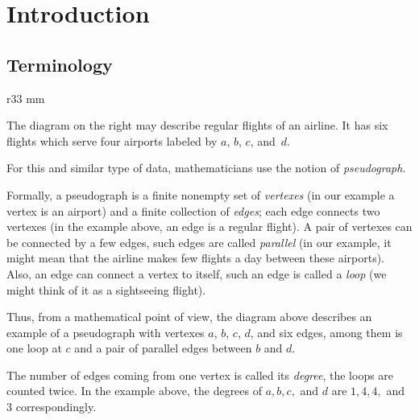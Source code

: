 \chapter{Introduction}
\section*{Terminology}

\begin{wrapfigure}{r}{33 mm}
\end{wrapfigure}

The diagram on the right may describe regular flights of an airline.
It has six flights which serve four airports labeled by $a$, $b$, $c$, and~$d$.

For this and similar type of data, mathematicians use the notion of \emph{pseudograph}.

Formally, a pseudograph is a finite nonempty set of \emph{vertexes}  (in our example a vertex is an airport) 
and a finite collection of \emph{edges}; each edge connects two vertexes (in the example above, an edge is a regular flight).
A pair of vertexes can be connected by a few edges, such edges are called \emph{parallel} (in our example, it might mean that the airline makes few flights a day between these airports). 
Also, an edge can connect a vertex to itself, such an edge is called a \emph{loop} (we might think of it as a sightseeing flight).

Thus, from a mathematical point of view, the diagram above describes an example of a pseudograph with vertexes $a$, $b$, $c$, $d$, and 
six edges, among them is one loop at $c$ and a pair of parallel edges between $b$ and $d$.

\smallskip

The number of edges coming from one vertex is called its \emph{degree}, the loops are counted twice.
In the example above,
the degrees of $a,b,c,$ and $d$ are $1,4,4,$ and $3$ correspondingly.

